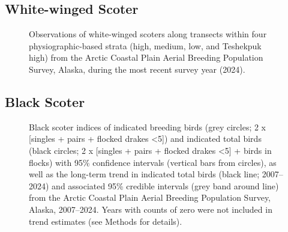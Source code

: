 \documentclass[
]{article}
\begin{document}
\endgroup{}

\newpage{}

\subsection*{White-winged Scoter}\label{white-winged-scoter-2}

\begin{figure}


\caption{\label{fig-WWSCmap}Observations of white-winged scoters along
transects within four physiographic-based strata (high, medium, low, and
Teshekpuk high) from the Arctic Coastal Plain Aerial Breeding Population
Survey, Alaska, during the most recent survey year (2024).}

\end{figure}%

\newpage{}

\subsection*{Black Scoter}\label{black-scoter}

\begin{figure}


\caption{\label{fig-BLSC}Black scoter indices of indicated breeding
birds (grey circles; 2 x {[}singles + pairs + flocked drakes
\textless5{]}) and indicated total birds (black circles; 2 x {[}singles
+ pairs + flocked drakes \textless5{]} + birds in flocks) with 95\%
confidence intervals (vertical bars from circles), as well as the
long-term trend in indicated total birds (black line; 2007--2024) and
associated 95\% credible intervals (grey band around line) from the
Arctic Coastal Plain Aerial Breeding Population Survey, Alaska,
2007--2024. Years with counts of zero were not included in trend
estimates (see Methods for details).}

\end{figure}%

\newpage{}
\end{document}
